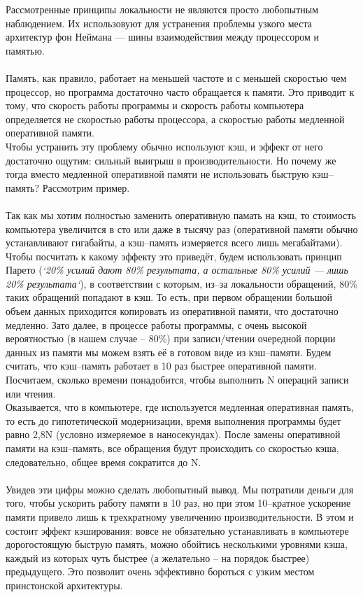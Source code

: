  Рассмотренные принципы локальности не являются просто любопытным наблюдением. Их использовуют для устранения проблемы узкого места архитектур фон Неймана — шины взаимодействия между процессором и памятью.
 \\
 \\ Память, как правило, работает на меньшей частоте и с меньшей скоростью чем процессор, но программа достаточно часто обращается к памяти. Это приводит к тому, что скорость работы программы и скорость работы компьютера определяется не скоростью работы процессора, а скоростью работы медленной оперативной памяти.
\\Чтобы устранить эту проблему обычно используют кэш, и эффект от него достаточно ощутим: сильный выигрыш в производительности.
Но почему же тогда вместо медленной оперативной памяти не использовать быструю кэш--память? Рассмотрим пример.
\\
\\Так как мы хотим полностью заменить оперативную памать на кэш, то стоимость компьютера увеличится в сто или даже в тысячу раз (оперативной памяти обычно устанавливают гигабайты, а кэш--память измеряется всего лишь мегабайтами). 
\\Чтобы посчитать к какому эффекту это приведёт, будем использовать принцип Парето (\emph{`20\% усилий дают 80\% результата, а остальные 80\% усилий — лишь 20\% результата`}), в соответствии с которым, из--за локальности обращений, 80\% таких обращений попадают в кэш. То есть, при первом обращении большой объем данных приходится копировать из оперативной памяти, что достаточно медленно. Зато далее, в процессе работы программы, с очень высокой вероятностью (в нашем случае – 80\%) при записи/чтении очередной порции данных из памяти мы можем взять её в готовом виде из кэш--памяти. Будем считать, что кэш--память работает в 10 раз быстрее оперативной памяти.
\\Посчитаем, сколько времени понадобится, чтобы выполнить N операций записи или чтения. 
\\Оказывается, что в компьютере, где используется медленная оперативная память, то есть до гипотетической модернизации, время выполнения программы будет равно 2,8N (условно измеряемое в наносекундах).
После замены оперативной памяти на кэш--память, все обращения будут происходить со скоростью кэша, следовательно, общее время сократится до N.
\\
\\
Увидев эти цифры можно сделать любопытный вывод. Мы потратили деньги для того, чтобы ускорить работу памяти в 10 раз, но при этом 10--кратное ускорение памяти привело лишь к трехкратному увеличению производительности. 
В этом и состоит эффект кэширования: вовсе не обязательно устанавливать в компьютере дорогостоящую быструю память, можно обойтись несколькими уровнями кэша, каждый из которых чуть быстрее (а желательно – на порядок быстрее) предыдущего. Это позволит очень эффективно бороться с узким местом принстонской архитектуры.

